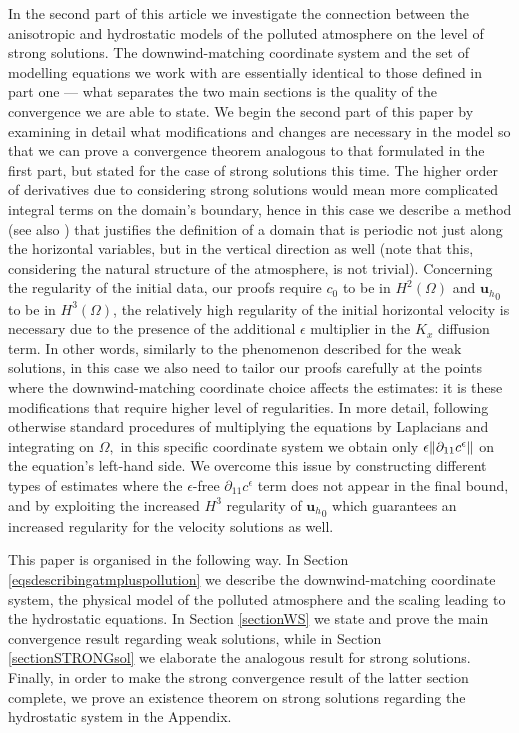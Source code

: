 \documentclass[11pt, a4paper]{article}
\begin{document}
In the second part of this article we investigate the connection between the anisotropic and hydrostatic models of the polluted atmosphere on the level of strong solutions. The downwind-matching coordinate system and the set of modelling equations we work with are essentially identical to those defined in part one --- what separates the two main sections is the quality of the convergence we are able to state. We begin the second part of this paper by examining in detail what modifications and changes are necessary in the model so that we can prove a convergence theorem analogous to that formulated in the first part, but stated for the case of strong solutions this time. The higher order of derivatives due to considering strong solutions would mean more complicated integral terms on the domain's boundary, hence in this case we describe a method (see also \cite{cao2014local}) that justifies the definition of a domain that is periodic not just along the horizontal variables, but in the vertical direction as well (note that this, considering the natural structure of the atmosphere, is not trivial). Concerning the regularity of the initial data, our proofs require $c_0$ to be in $H^2(\Omega)$ and ${\mathbf{u}_h}_0$ to be in $H^3(\Omega)$, the relatively high regularity of the initial horizontal velocity is necessary due to the presence of the additional $\epsilon$ multiplier in the $K_x$ diffusion term. In other words, similarly to the phenomenon described for the weak solutions, in this case we also need to tailor our proofs carefully at the points where the downwind-matching coordinate choice affects the estimates: it is these modifications that require higher level of regularities. 
In more detail, following otherwise standard procedures of multiplying the equations by Laplacians and integrating on $\Omega,$ in this specific coordinate system we obtain only $\epsilon \norm{\partial_{11} c^\epsilon}$ on the equation's left-hand side. 
We overcome this issue by constructing different types of estimates where the $\epsilon$-free $\partial_{11} c^\epsilon$ term does not appear in the final bound, and by exploiting the increased $H^3$ regularity of ${\mathbf{u}_h}_0$ which guarantees an increased regularity for the velocity solutions as well.

This paper is organised in the following way. In Section \ref{eqsdescribingatmpluspollution} we describe the downwind-matching coordinate system, the physical model of the polluted atmosphere and the scaling leading to the hydrostatic equations. In Section \ref{sectionWS} we state and prove the main convergence result regarding weak solutions, while in Section \ref{sectionSTRONGsol} we elaborate the analogous result for strong solutions. Finally, in order to make the strong convergence result of the latter section complete, we prove an existence theorem on strong solutions regarding the hydrostatic system in the Appendix.
\end{document}
